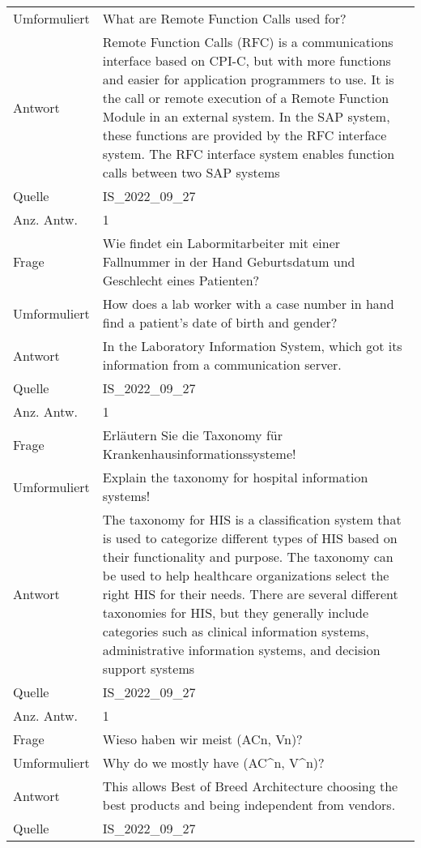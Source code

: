 \begin{landscape}
\begin{longtable}{p{3cm}p{}}
    Umformuliert & What are Remote Function Calls used for? \\
    Antwort & Remote Function Calls (RFC) is a communications interface based on CPI-C, but with more functions and easier for application programmers to use.
    It is the call or remote execution of a Remote Function Module in an external system.
    In the SAP system, these functions are provided by the RFC interface system.
    The RFC interface system enables function calls between two SAP systems \\
    Quelle & IS\_2022\_09\_27 \\
    Anz. Antw.& 1 \\
    \midrule
    Frage & Wie findet ein Labormitarbeiter mit einer Fallnummer in der Hand Geburtsdatum und Geschlecht eines Patienten? \\
    Umformuliert & How does a lab worker with a case number in hand find a patient's date of birth and gender? \\
    Antwort & In the Laboratory Information System, which got its information from a communication server.\\
    Quelle & IS\_2022\_09\_27 \\
    Anz. Antw.& 1 \\
    \midrule
    Frage & Erläutern Sie die Taxonomy für Krankenhausinformationssysteme! \\
    Umformuliert & Explain the taxonomy for hospital information systems! \\
    Antwort & The taxonomy for HIS is a classification system that is used to categorize different types of HIS based on their functionality and purpose.
    The taxonomy can be used to help healthcare organizations select the right HIS for their needs.
    There are several different taxonomies for HIS, but they generally include categories such as clinical information systems, administrative information systems, and decision support systems \\
    Quelle & IS\_2022\_09\_27 \\
    Anz. Antw.& 1 \\
    \midrule
    Frage & Wieso haben wir meist (ACn, Vn)? \\
    Umformuliert & Why do we mostly have (AC\textasciicircum{}n, V\textasciicircum{}n)? \\
    Antwort & This allows Best of Breed Architecture choosing the best products and being independent from vendors.\\
    Quelle & IS\_2022\_09\_27 \\

\end{longtable}
\end{landscape}

